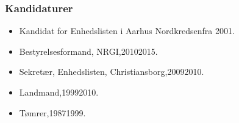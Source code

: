 \documentclass[11pt, a4paper]{awesome-cv}
\begin{document}
\begin{cvletter}
\subsubsection*{Kandidaturer}
\begin{itemize}
\item Kandidat for Enhedslisten i Aarhus Nordkredsenfra 2001.
\end{itemize}
\begin{itemize}
\item Bestyrelsesformand, NRGI,20102015.
\item Sekretær, Enhedslisten, Christiansborg,20092010.
\item Landmand,19992010.
\item Tømrer,19871999.
\end{itemize}
\end{cvletter}
\end{document}
